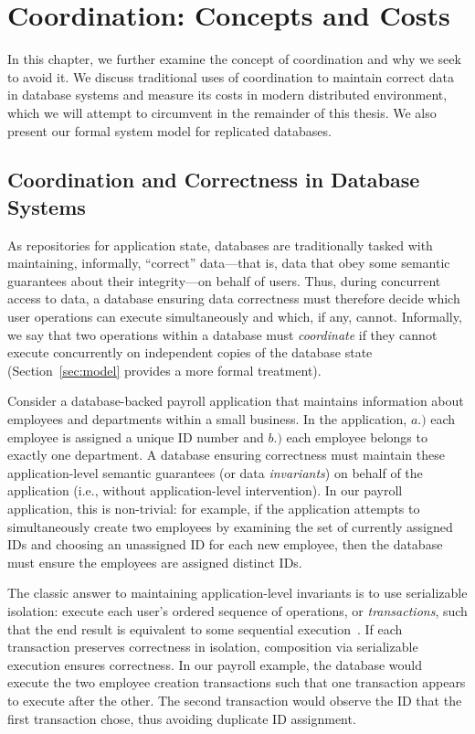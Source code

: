 
\newcommand{\ttf}[1]{\texttt{#1}\xspace}
\newcommand{\dpc}{\ttf{D-2PC}}
\newcommand{\cpc}{\ttf{C-2PC}}

\chapter{Coordination: Concepts and Costs}
\label{c.background}

In this chapter, we further examine the concept of coordination and
why we seek to avoid it. We discuss traditional uses of coordination
to maintain correct data in database systems and measure its costs in
modern distributed environment, which we will attempt to circumvent in
the remainder of this thesis. We also present our formal system model
for replicated databases.

\section{Coordination and Correctness in Database Systems}
\label{sec:t-motivation}
As repositories for application state, databases are traditionally
tasked with maintaining, informally, ``correct'' data---that is, data
that obey some semantic guarantees about their integrity---on behalf
of users. Thus, during concurrent access to data, a database ensuring
data correctness must therefore decide which user operations can
execute simultaneously and which, if any, cannot. Informally, we say
that two operations within a database must \textit{coordinate} if they
cannot execute concurrently on independent copies of the database state
(Section~\ref{sec:model} provides a more formal treatment).

 Consider a database-backed payroll application
that maintains information about employees and departments within a
small business. In the application, $a.)$ each employee is assigned a
unique ID number and $b.)$ each employee belongs to exactly one
department. A database ensuring correctness must maintain these
application-level semantic guarantees (or data \textit{invariants}) on
behalf of the application (i.e., without application-level
intervention). In our payroll application, this is non-trivial: for
example, if the application attempts to simultaneously create two
employees by examining the set of currently assigned IDs and choosing
an unassigned ID for each new employee, then the database must ensure
the employees are assigned distinct IDs.

 The classic answer to
maintaining application-level invariants is to use serializable
isolation: execute each user's ordered sequence of operations, or
\textit{transactions}, such that the end result is equivalent to some
sequential execution~\cite{tamer-book,bernstein-book,gray-virtues}. If
each transaction preserves correctness in isolation, composition via
serializable execution ensures correctness. In our payroll example,
the database would execute the two employee creation transactions such
that one transaction appears to execute after the other. The second
transaction would observe the ID that the first transaction chose,
thus avoiding duplicate ID assignment.

